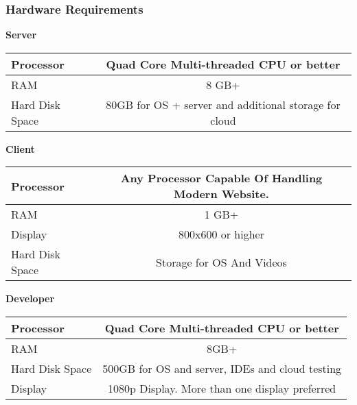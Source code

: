 		\subsubsection{Hardware Requirements}
		\begin{center}
			\textbf{\large Server}
			\vs
			\bgroup
			\def\arraystretch{2}%
			\begin{tabular}{|m{4cm}|c|}
				\hline
				Processor & Quad Core Multi-threaded CPU or better \\
				\hline
				RAM & 8 GB+ \\
				\hline
				Hard Disk Space  & 80GB for OS + server and additional storage for cloud  \\
				\hline					
			\end{tabular}
			\vs[1]
			\textbf{\large Client}
			\vs[1]
			\begin{tabular}{|m{5cm}|c|}
				\hline
				Processor  & Any Processor Capable Of Handling Modern Website. \\
				\hline
				RAM & 1 GB+\\
				\hline
				Display & 800x600 or higher\\
				\hline
				Hard Disk Space&Storage for OS And Videos \\
				
				
				\hline					
			\end{tabular}
		\vs[1]
			\textbf{\large Developer}
			\vs[1]
			\begin{tabular}{|m{5cm}|c|}
				\hline
				Processor & Quad Core Multi-threaded CPU or better				 \\
				\hline
				RAM & 8GB+				\\
				\hline
				Hard Disk Space
				  & 500GB for OS and server, IDEs and cloud testing 
				  		\\
				\hline			
				Display  & 1080p Display. More than one display preferred
						\\						
				\hline
			\end{tabular}
			\egroup
		\end{center}